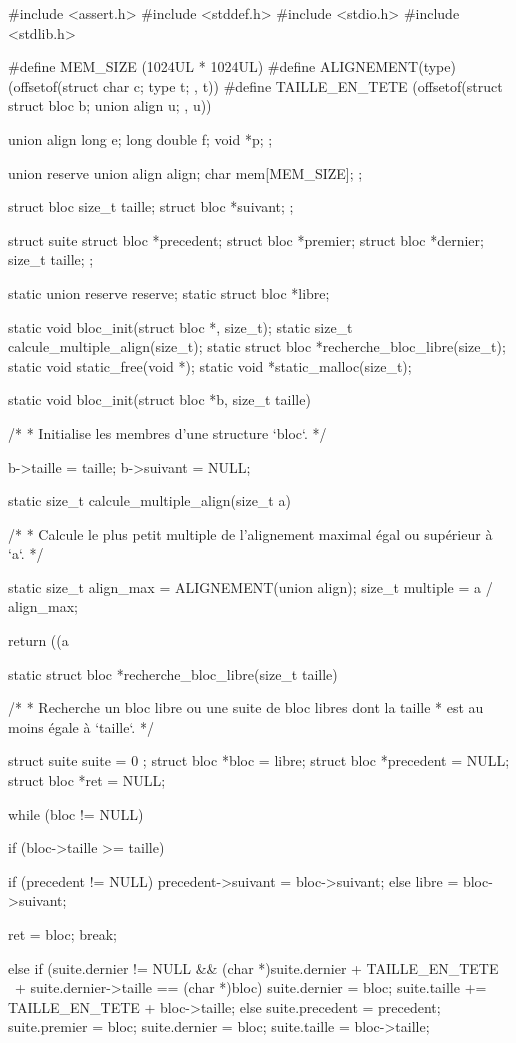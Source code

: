 \begin{C}
#include <assert.h>
#include <stddef.h>
#include <stdio.h>
#include <stdlib.h>

#define MEM_SIZE (1024UL * 1024UL)
#define ALIGNEMENT(type) (offsetof(struct { char c; type t; }, t))
#define TAILLE_EN_TETE (offsetof(struct { struct bloc b; union align u; }, u))

union align
{
    long e;
    long double f;
    void *p;
};

union reserve
{
    union align align;
    char mem[MEM_SIZE];
};

struct bloc
{
    size_t taille;
    struct bloc *suivant;
};

struct suite
{
    struct bloc *precedent;
    struct bloc *premier;
    struct bloc *dernier;
    size_t taille;
};


static union reserve reserve;
static struct bloc *libre;

static void bloc_init(struct bloc *, size_t);
static size_t calcule_multiple_align(size_t);
static struct bloc *recherche_bloc_libre(size_t);
static void static_free(void *);
static void *static_malloc(size_t);


static void bloc_init(struct bloc *b, size_t taille)
{
    /*
     * Initialise les membres d'une structure `bloc`.
     */

    b->taille = taille;
    b->suivant = NULL;
}


static size_t calcule_multiple_align(size_t a)
{
    /*
     * Calcule le plus petit multiple de l'alignement maximal égal ou supérieur à `a`.
     */

    static size_t align_max = ALIGNEMENT(union align);
    size_t multiple = a / align_max;

    return ((a %
}


static struct bloc *recherche_bloc_libre(size_t taille)
{
    /*
     * Recherche un bloc libre ou une suite de bloc libres dont la taille
     * est au moins égale à `taille`.
     */

    struct suite suite = { 0 };
    struct bloc *bloc = libre;
    struct bloc *precedent = NULL;
    struct bloc *ret = NULL;

    while (bloc != NULL)
    {
        if (bloc->taille >= taille)
        {
            if (precedent != NULL)
                precedent->suivant = bloc->suivant;
            else
                libre = bloc->suivant;

            ret = bloc;
            break;
        }
        else if (suite.dernier != NULL && (char *)suite.dernier + TAILLE_EN_TETE \
        + suite.dernier->taille == (char *)bloc)
        {
            suite.dernier = bloc;
            suite.taille += TAILLE_EN_TETE + bloc->taille;
        }
        else
        {
            suite.precedent = precedent;
            suite.premier = bloc;
            suite.dernier = bloc;
            suite.taille = bloc->taille;
        }

}}
\end{C}
